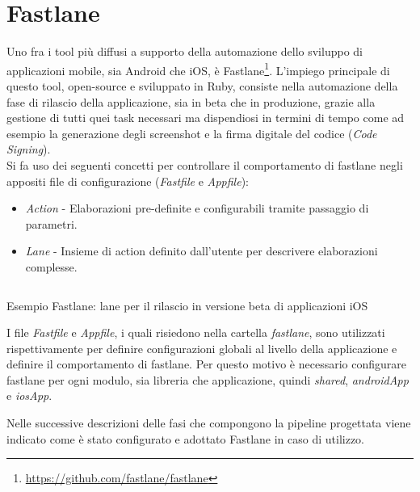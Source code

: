 \section{Fastlane}
Uno fra i tool più diffusi a supporto della automazione dello sviluppo di applicazioni mobile, sia Android che iOS, è Fastlane\footnote{\url{https://github.com/fastlane/fastlane}}. L'impiego principale di questo tool, open-source e sviluppato in Ruby, consiste nella automazione della fase di rilascio della applicazione, sia in beta che in produzione, grazie alla gestione di tutti quei task necessari ma dispendiosi in termini di tempo come ad esempio la generazione degli screenshot e la firma digitale del codice (\textit{Code Signing}).\\
Si fa uso dei seguenti concetti per controllare il comportamento di fastlane negli appositi file di configurazione (\textit{Fastfile} e \textit{Appfile}):
\begin{itemize}
    \item \textit{Action} - Elaborazioni pre-definite e configurabili tramite passaggio di parametri.
    \item \textit{Lane} - Insieme di action definito dall'utente per descrivere elaborazioni complesse.
\end{itemize}

\begin{listing}[H]
\inputminted{ruby}{code/4-fastlane}
\caption{Esempio Fastlane: lane per il rilascio in versione beta di applicazioni iOS}
\end{listing}

I file \textit{Fastfile} e \textit{Appfile}, i quali risiedono nella cartella \textit{fastlane}, sono utilizzati rispettivamente per definire configurazioni globali al livello della applicazione e definire il comportamento di fastlane. Per questo motivo è necessario configurare fastlane per ogni modulo, sia libreria che applicazione, quindi \textit{shared}, \textit{androidApp} e \textit{iosApp}.

Nelle successive descrizioni delle fasi che compongono la pipeline progettata viene indicato come è stato configurato e adottato Fastlane in caso di utilizzo.